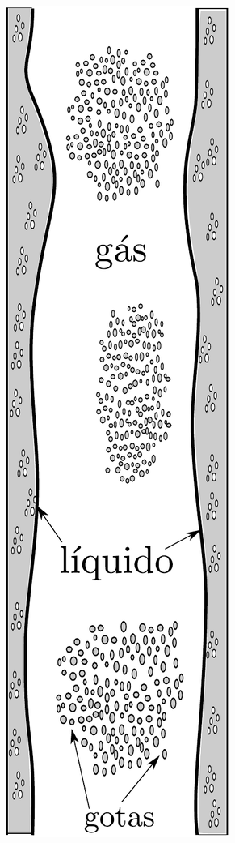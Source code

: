 \begin{figure}[h!]
\begin{center}
		{\includegraphics[angle=00, scale=0.3]{figs/v_wispy-annular.pdf}
		\hspace{0.8cm}}
		\subfloat[Anular]

\end{center}
\end{figure}
